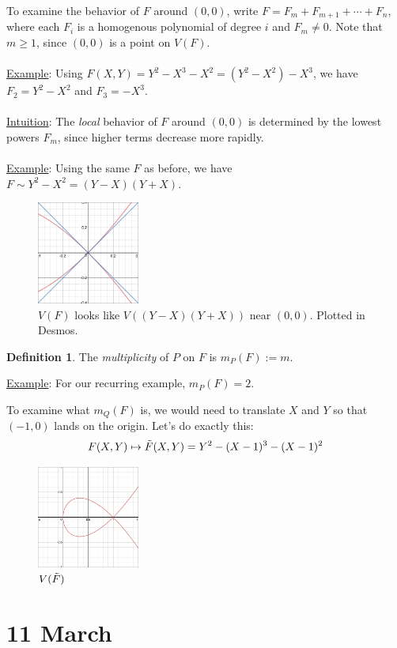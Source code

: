 \documentclass[12pt]{article}
\newcommand{\ita}[1]{\textit{#1}}
\theoremstyle{definition}
\newtheorem{definition}[theorem]{Definition}
\begin{document}
To examine the behavior of $F$ around $(0,0)$, write $F=F_m+F_{m+1}+\dotsb+F_n$, where each $F_i$ is a homogenous polynomial of degree $i$ and $F_m\neq0$. Note that $m\geq1$, since $(0,0)$ is a point on $V(F)$.\\\\
\underline{Example}: Using $F(X,Y)=Y^2-X^3-X^2=(Y^2-X^2)-X^3$, we have $F_2=Y^2-X^2$ and $F_3=-X^3$.\\\\
\underline{Intuition}: The \ita{local} behavior of $F$ around $(0,0)$ is determined by the lowest powers $F_m$, since higher terms decrease more rapidly.\\\\
\underline{Example}: Using the same $F$ as before, we have $F\sim Y^2-X^2=(Y-X)(Y+X)$. 
\begin{figure}[H]
    \centering
    \includegraphics[width=0.3\textwidth]{19.png}
    \caption{$V(F)$ looks like $V((Y-X)(Y+X))$ near $(0,0)$. Plotted in Desmos.}
\end{figure}
\begin{definition}
    The \ita{multiplicity} of $P$ on $F$ is $m_P(F):=m$.
\end{definition}
\underline{Example}: For our recurring example, $m_P(F)=2$. 

To examine what $m_Q(F)$ is, we would need to translate $X$ and $Y$ so that $(-1,0)$ lands on the origin. Let's do exactly this: 
\[F(X,Y)\mapsto \Tilde{F}(X,Y)=Y^2-(X-1)^3-(X-1)^2\]
\begin{figure}[H]
    \centering
    \includegraphics[width=0.3\textwidth]{20.png}
    \caption{$V(\Tilde{F})$}
\end{figure}
\section{11 March}
\end{document}
